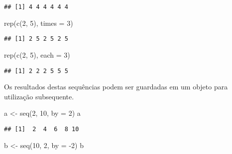 \documentclass[
]{book}
\newenvironment{Shaded}{\begin{snugshade}}{\end{snugshade}}
\newcommand{\AttributeTok}[1]{\textcolor[rgb]{0.77,0.63,0.00}{#1}}
\newcommand{\DecValTok}[1]{\textcolor[rgb]{0.00,0.00,0.81}{#1}}
\newcommand{\FunctionTok}[1]{\textcolor[rgb]{0.00,0.00,0.00}{#1}}
\newcommand{\NormalTok}[1]{#1}
\newcommand{\OtherTok}[1]{\textcolor[rgb]{0.56,0.35,0.01}{#1}}
\newcommand{\SpecialCharTok}[1]{\textcolor[rgb]{0.00,0.00,0.00}{#1}}
\begin{document}
\begin{verbatim}
## [1] 4 4 4 4 4 4
\end{verbatim}

\begin{Shaded}
\begin{Highlighting}[]
\FunctionTok{rep}\NormalTok{(}\FunctionTok{c}\NormalTok{(}\DecValTok{2}\NormalTok{, }\DecValTok{5}\NormalTok{), }\AttributeTok{times =} \DecValTok{3}\NormalTok{)}
\end{Highlighting}
\end{Shaded}

\begin{verbatim}
## [1] 2 5 2 5 2 5
\end{verbatim}

\begin{Shaded}
\begin{Highlighting}[]
\FunctionTok{rep}\NormalTok{(}\FunctionTok{c}\NormalTok{(}\DecValTok{2}\NormalTok{, }\DecValTok{5}\NormalTok{), }\AttributeTok{each =} \DecValTok{3}\NormalTok{)}
\end{Highlighting}
\end{Shaded}

\begin{verbatim}
## [1] 2 2 2 5 5 5
\end{verbatim}

Os resultados destas sequências podem ser guardadas em um objeto para utilização subsequente.

\begin{Shaded}
\begin{Highlighting}[]
\NormalTok{a }\OtherTok{\textless{}{-}} \FunctionTok{seq}\NormalTok{(}\DecValTok{2}\NormalTok{, }\DecValTok{10}\NormalTok{, }\AttributeTok{by =} \DecValTok{2}\NormalTok{)}
\NormalTok{a}
\end{Highlighting}
\end{Shaded}

\begin{verbatim}
## [1]  2  4  6  8 10
\end{verbatim}

\begin{Shaded}
\begin{Highlighting}[]
\NormalTok{b }\OtherTok{\textless{}{-}} \FunctionTok{seq}\NormalTok{(}\DecValTok{10}\NormalTok{, }\DecValTok{2}\NormalTok{, }\AttributeTok{by =} \SpecialCharTok{{-}}\DecValTok{2}\NormalTok{)}
\NormalTok{b}
\end{Highlighting}
\end{Shaded}
\end{document}
